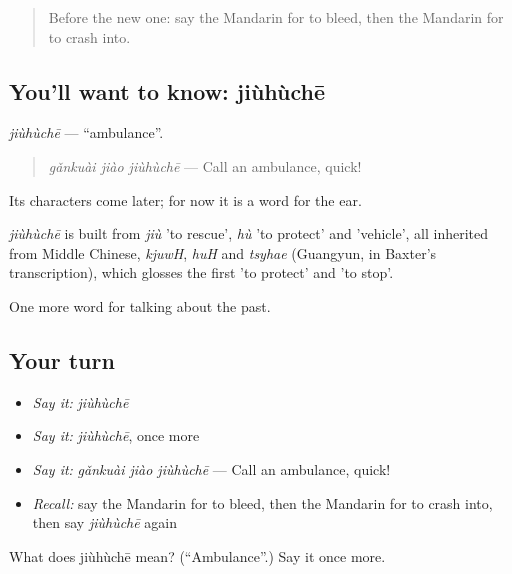 \begin{quote}
Before the new one: say the Mandarin for to bleed, then the Mandarin for to crash into.
\end{quote}

\subsection*{You'll want to know: jiùhùchē}
\emph{jiùhùchē} — \textquotedblleft{}ambulance\textquotedblright{}.

\begin{quote}
\emph{gǎnkuài jiào jiùhùchē} — Call an ambulance, quick!
\end{quote}

Its characters come later; for now it is a word for the ear.

\begin{cousinweb}
\emph{jiùhùchē} is built from \emph{jiù} 'to rescue', \emph{hù} 'to protect' and  'vehicle', all inherited from Middle Chinese, \emph{kjuwH}, \emph{huH} and \emph{tsyhae} (Guangyun, in Baxter's transcription), which glosses the first 'to protect' and 'to stop'.
\end{cousinweb}

\begin{grammarlens}[title={What you've built}]
One more word for talking about the past.
\end{grammarlens}

\subsection*{Your turn}
\begin{itemize}
\raggedright
  \item \emph{Say it:} \emph{jiùhùchē}
  \item \emph{Say it:} \emph{jiùhùchē}, once more
  \item \emph{Say it:} \emph{gǎnkuài jiào jiùhùchē} — Call an ambulance, quick!
  \item \emph{Recall:} say the Mandarin for to bleed, then the Mandarin for to crash into, then say \emph{jiùhùchē} again
\end{itemize}

\begin{tcolorbox}[breakable,colback=teal!4,colframe=teal!35!black,title={Before you move on}]
What does jiùhùchē mean? (\textquotedblleft{}Ambulance\textquotedblright{}.) Say it once more.
\end{tcolorbox}
